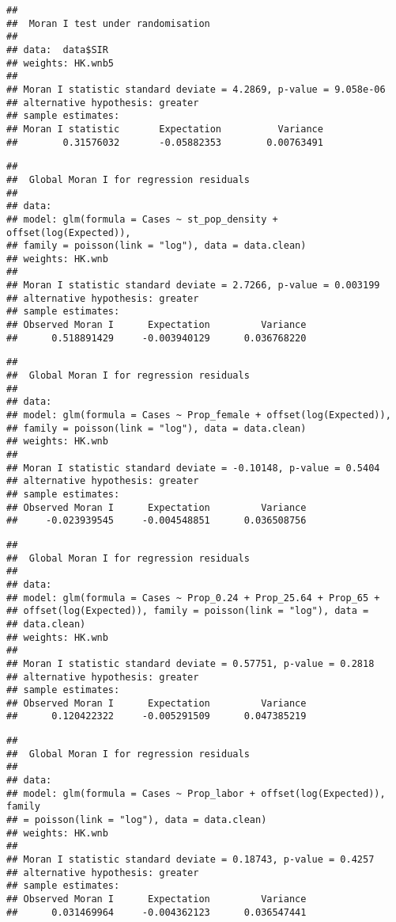\documentclass[]{article}
\begin{document}
\begin{verbatim}
## 
##  Moran I test under randomisation
## 
## data:  data$SIR  
## weights: HK.wnb5    
## 
## Moran I statistic standard deviate = 4.2869, p-value = 9.058e-06
## alternative hypothesis: greater
## sample estimates:
## Moran I statistic       Expectation          Variance 
##        0.31576032       -0.05882353        0.00763491
\end{verbatim}

\begin{verbatim}
## 
##  Global Moran I for regression residuals
## 
## data:  
## model: glm(formula = Cases ~ st_pop_density + offset(log(Expected)),
## family = poisson(link = "log"), data = data.clean)
## weights: HK.wnb
## 
## Moran I statistic standard deviate = 2.7266, p-value = 0.003199
## alternative hypothesis: greater
## sample estimates:
## Observed Moran I      Expectation         Variance 
##      0.518891429     -0.003940129      0.036768220
\end{verbatim}

\begin{verbatim}
## 
##  Global Moran I for regression residuals
## 
## data:  
## model: glm(formula = Cases ~ Prop_female + offset(log(Expected)),
## family = poisson(link = "log"), data = data.clean)
## weights: HK.wnb
## 
## Moran I statistic standard deviate = -0.10148, p-value = 0.5404
## alternative hypothesis: greater
## sample estimates:
## Observed Moran I      Expectation         Variance 
##     -0.023939545     -0.004548851      0.036508756
\end{verbatim}

\begin{verbatim}
## 
##  Global Moran I for regression residuals
## 
## data:  
## model: glm(formula = Cases ~ Prop_0.24 + Prop_25.64 + Prop_65 +
## offset(log(Expected)), family = poisson(link = "log"), data =
## data.clean)
## weights: HK.wnb
## 
## Moran I statistic standard deviate = 0.57751, p-value = 0.2818
## alternative hypothesis: greater
## sample estimates:
## Observed Moran I      Expectation         Variance 
##      0.120422322     -0.005291509      0.047385219
\end{verbatim}

\begin{verbatim}
## 
##  Global Moran I for regression residuals
## 
## data:  
## model: glm(formula = Cases ~ Prop_labor + offset(log(Expected)), family
## = poisson(link = "log"), data = data.clean)
## weights: HK.wnb
## 
## Moran I statistic standard deviate = 0.18743, p-value = 0.4257
## alternative hypothesis: greater
## sample estimates:
## Observed Moran I      Expectation         Variance 
##      0.031469964     -0.004362123      0.036547441
\end{verbatim}
\end{document}
